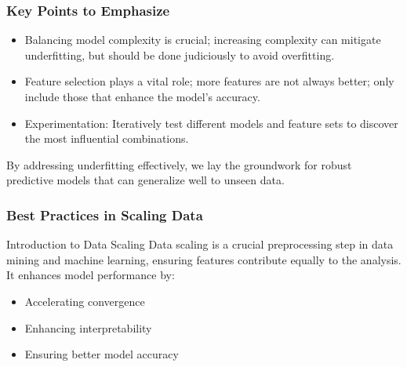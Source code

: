 \documentclass[aspectratio=169]{beamer}
\begin{document}
\begin{frame}[fragile]
    \frametitle{Key Points to Emphasize}
    \begin{itemize}
        \item Balancing model complexity is crucial; increasing complexity can mitigate underfitting, but should be done judiciously to avoid overfitting.
        \item Feature selection plays a vital role; more features are not always better; only include those that enhance the model’s accuracy.
        \item Experimentation: Iteratively test different models and feature sets to discover the most influential combinations.
    \end{itemize}

    By addressing underfitting effectively, we lay the groundwork for robust predictive models that can generalize well to unseen data.
\end{frame}

\begin{frame}[fragile]
  \frametitle{Best Practices in Scaling Data}
  
  \begin{block}{Introduction to Data Scaling}
    Data scaling is a crucial preprocessing step in data mining and machine learning, ensuring features contribute equally to the analysis. It enhances model performance by:
    \begin{itemize}
        \item Accelerating convergence
        \item Enhancing interpretability
        \item Ensuring better model accuracy
    \end{itemize}
  \end{block}
\end{frame}
\end{document}
